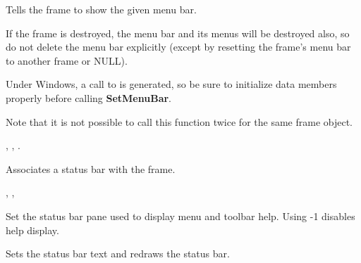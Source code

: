 \label{wxframesetmenubar}


Tells the frame to show the given menu bar.




If the frame is destroyed, the
menu bar and its menus will be destroyed also, so do not delete the menu
bar explicitly (except by resetting the frame's menu bar to another
frame or NULL).

Under Windows, a call to  is generated, so be sure to initialize
data members properly before calling {\bf SetMenuBar}.

Note that it is not possible to call this function twice for the same frame object.


, , .

\label{wxframesetstatusbar}


Associates a status bar with the frame.


, ,\rtfsp
{}

\label{wxframesetstatusbarpane}


Set the status bar pane used to display menu and toolbar help.
Using -1 disables help display.

\label{wxframesetstatustext}


Sets the status bar text and redraws the status bar.



